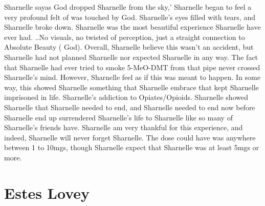\documentclass[12pt]{book}
\begin{document}
Sharnelle sayas God dropped Sharnelle from the sky,' Sharnelle began to feel a very profound felt of was touched by God. Sharnelle's eyes filled with tears, and Sharnelle broke down. Sharnelle was the most beautiful experience Sharnelle have ever had. ..No visuals, no twisted of perception, just a straight connection to Absolute Beauty ( God). Overall, Sharnelle believe this wasn't an accident, but Sharnelle had not planned Sharnelle nor expected Sharnelle in any way. The fact that Sharnelle had ever tried to smoke 5-MeO-DMT from that pipe never crossed Sharnelle's mind. However, Sharnelle feel as if this was meant to happen. In some way, this showed Sharnelle something that Sharnelle embrace that kept Sharnelle imprisoned in life. Sharnelle's addiction to Opiates/Opioids. Sharnelle showed Sharnelle that Sharnelle needed to end, and Sharnelle needed to end now before Sharnelle end up surrendered Sharnelle's life to Sharnelle like so many of Sharnelle's friends have. Sharnelle am very thankful for this experience, and indeed, Sharnelle will never forget Sharnelle. The dose could have was anywhere between 1 to 10mgs, though Sharnelle expect that Sharnelle was at least 5mgs or more.



\chapter{Estes Lovey}
\end{document}
